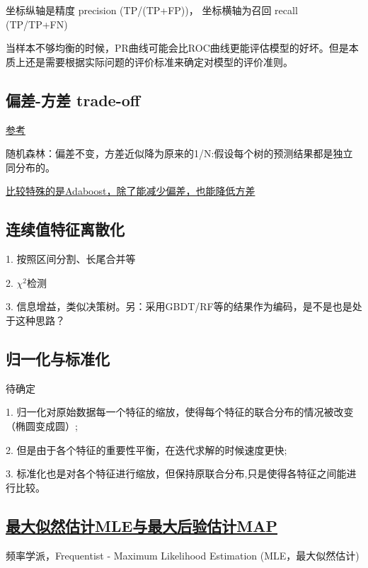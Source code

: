 {}
坐标纵轴是精度 precision (TP/(TP+FP))， 坐标横轴为召回 recall (TP/TP+FN)

当样本不够均衡的时候，PR曲线可能会比ROC曲线更能评估模型的好坏。但是本质上还是需要根据实际问题的评价标准来确定对模型的评价准则。


\subsection{偏差-方差 trade-off}
\href{https://zhuanlan.zhihu.com/p/36822575}{参考}

随机森林：偏差不变，方差近似降为原来的1/N:假设每个树的预测结果都是独立同分布的。

\href{https://www.zhihu.com/question/41047671}{比较特殊的是Adaboost，除了能减少偏差，也能降低方差}

\subsection{连续值特征离散化}
1. 按照区间分割、长尾合并等

2. $\chi^2$检测

3. 信息增益，类似决策树。另：采用GBDT/RF等的结果作为编码，是不是也是处于这种思路？

\subsection{归一化与标准化}
待确定

1. 归一化对原始数据每一个特征的缩放，使得每个特征的联合分布的情况被改变（椭圆变成圆）;

2. 但是由于各个特征的重要性平衡，在迭代求解的时候速度更快;

3. 标准化也是对各个特征进行缩放，但保持原联合分布,只是使得各特征之间能进行比较。

\subsection{\href{https://zhuanlan.zhihu.com/p/32480810}{最大似然估计MLE与最大后验估计MAP}}
频率学派，Frequentist - Maximum Likelihood Estimation (MLE，最大似然估计)

